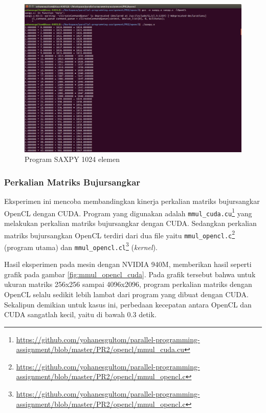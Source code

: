 \begin{figure}
	\centering
	\includegraphics[width=1.0\textwidth]
	{pics/saxpy.png}
	\caption{Program SAXPY 1024 elemen}
	\label{fig:saxpy}
\end{figure}

\subsubsection{Perkalian Matriks Bujursangkar}

Eksperimen ini mencoba membandingkan kinerja perkalian matriks bujursangkar OpenCL \cite{opencl.mmul} dengan CUDA. Program yang digunakan adalah \verb|mmul_cuda.cu|\footnote{\url{https://github.com/yohanesgultom/parallel-programming-assignment/blob/master/PR2/opencl/mmul_cuda.cu}} yang melakukan perkalian matriks bujursangkar dengan CUDA. Sedangkan perkalian matriks bujursangkan OpenCL terdiri dari dua file yaitu \verb|mmul_opencl.c|\footnote{\url{https://github.com/yohanesgultom/parallel-programming-assignment/blob/master/PR2/opencl/mmul_opencl.c}} (program utama) dan \verb|mmul_opencl.cl|\footnote{\url{https://github.com/yohanesgultom/parallel-programming-assignment/blob/master/PR2/opencl/mmul_opencl.c}} (\textit{kernel}).

Hasil eksperimen pada mesin dengan NVIDIA 940M, memberikan hasil seperti grafik pada gambar \ref{fig:mmul_opencl_cuda}. Pada grafik tersebut bahwa untuk ukuran matriks 256x256 sampai 4096x2096, program perkalian matriks dengan OpenCL selalu sedikit lebih lambat dari program yang dibuat dengan CUDA. Sekalipun demikian untuk kasus ini, perbedaan kecepatan antara OpenCL dan CUDA sangatlah kecil, yaitu di bawah 0.3 detik.

